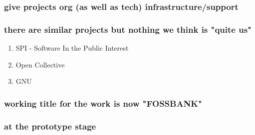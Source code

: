 \documentclass[11pt]{article}
\begin{document}
\subsubsection{give projects org (as well as tech) infrastructure/support}
\label{sec:orgc1693e7}
\subsubsection{there are similar projects but nothing we think is "quite us"}
\label{sec:org1e718a7}
\begin{enumerate}
\item SPI - Software In the Public Interest
\label{sec:org3f88b13}
\item Open Collective
\label{sec:org22c9cd2}
\item GNU
\label{sec:org04ee509}
\end{enumerate}
\subsubsection{working title for the work is now "FOSSBANK"}
\label{sec:orgca17b3b}
\subsubsection{at the prototype stage}
\label{sec:orgf97606d}
\end{document}
